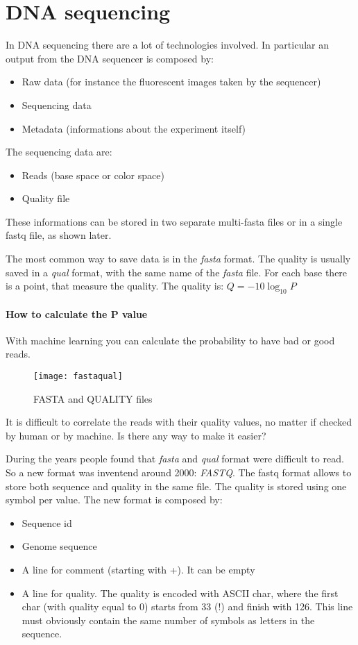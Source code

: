 \newpage
\section{DNA sequencing}
In DNA sequencing there are a lot of technologies involved.
In particular an output from the DNA sequencer is composed by:

\begin{itemize}
  \item Raw data (for instance the fluorescent images taken by the sequencer)
  \item Sequencing data
  \item Metadata (informations about the experiment itself)
\end{itemize}

The sequencing data are:
\begin{itemize}
	\item Reads (base space or color space)
	\item Quality file
\end{itemize}

These informations can be stored in two separate multi-fasta files or in a
single fastq file, as shown later.

The most common way to save data is in the \textit{fasta} format. The quality is
usually saved in a \textit{qual} format, with the same name of the
\textit{fasta} file. For each base there is a point, that measure the quality.
The quality is: $Q=-10\log_{10}P$

\paragraph*{How to calculate the P value} With machine learning you can
calculate the probability to have bad or good reads. \\

\begin{figure}[H]
  \centering
  \texttt{[image: fastaqual]}
  \caption{FASTA and QUALITY files}
  \label{fig:fastaqual}
\end{figure}

It is difficult to correlate the reads with their quality values, no matter if checked by human or by machine.
Is there any way to make it easier?

During the years people found that \textit{fasta} and \textit{qual} format were
difficult to read. So a new format was inventend around 2000: \textit{FASTQ}.
The fastq format allows to store both sequence and quality in the same file.
The quality is stored using one symbol per value.
The new format is composed by:
\begin{itemize}
  \item Sequence id
  \item Genome sequence
  \item A line for comment (starting with +). It can be empty
  \item A line for quality. The quality is encoded with ASCII char, where the
first char (with quality equal to 0) starts from 33 (!) and finish with 126.
This line must obviously contain the same number of symbols as letters in
the sequence.
\end{itemize}

